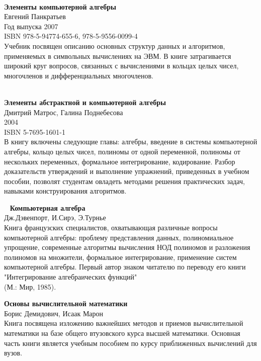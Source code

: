 \begin{thebibliography}{99}
\ \\
\textbf{Элементы компьютерной алгебры}\\
Евгений Панкратьев\\
Год выпуска	2007\\
ISBN	978-5-94774-655-6, 978-5-9556-0099-4\\
Учебник посвящен описанию основных структур данных и алгоритмов, применяемых в
символьных вычислениях на ЭВМ. В книге затрагивается широкий круг вопросов,
связанных с вычислениями в кольцах целых чисел, многочленов и дифференциальных
многочленов.

\ \\
\textbf{Элементы абстрактной и компьютерной алгебры}\\
Дмитрий Матрос, Галина Поднебесова\\
2004\\
ISBN	5-7695-1601-1\\
В книгу включены следующие главы: алгебры, введение в системы компьютерной
алгебры, кольцо целых чисел, полиномы от одной переменной, полиномы от
нескольких переменных, формальное интегрирование, кодирование. Разбор
доказательств утверждений и выполнение упражнений, приведенных в учебном
пособии, позволят студентам овладеть методами решения практических задач,
навыками конструирования алгоритмов.

\ 
\textbf{Компьютерная алгебра}\\
Дж.Дэвенпорт, И.Сирэ, Э.Турнье\\
Книга французских специалистов, охватывающая различные вопросы компьютерной
алгебры: проблему представления данных, полиномиальное упрощение, современные
алгоритмы вычисления НОД полиномов и разложения полиномов на множители,
формальное интегрирование, применение систем компьютерной алгебры. Первый автор
знаком читателю по переводу его книги "Интегрирование алгебраических функций"\\
(М.: Мир, 1985).


\textbf{Основы вычислительной математики}\\
Борис Демидович, Исаак Марон\\
Книга посвящена изложению важнейших методов и приемов вычислительной математики
на базе общего втузовского курса высшей математики. Основная часть книги
является учебным пособием по курсу приближенных вычислений для вузов.


\end{thebibliography}
